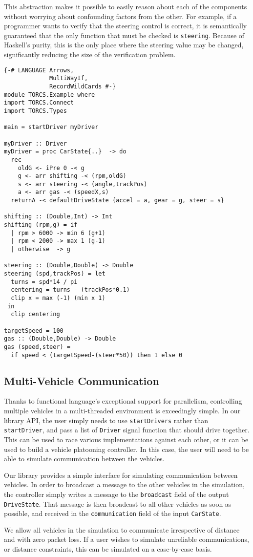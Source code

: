 This abstraction makes it possible to easily reason about each of the components without worrying about confounding factors from the other.
For example, if a programmer wants to verify that the steering control is correct, it is semantically guaranteed that the only function that must be checked is \texttt{steering}.
Because of Haskell's purity, this is the only place where the steering value may be changed, significantly reducing the size of the verification problem.

\begin{lstlisting}[float,floatplacement=TR,caption=A complete basic controller in Yampa, label=lst:driver]
{-# LANGUAGE Arrows,
             MultiWayIf,
             RecordWildCards #-}
module TORCS.Example where
import TORCS.Connect
import TORCS.Types

main = startDriver myDriver

myDriver :: Driver
myDriver = proc CarState{..}  -> do
  rec 
    oldG <- iPre 0 -< g
    g <- arr shifting -< (rpm,oldG)
    s <- arr steering -< (angle,trackPos)
    a <- arr gas -< (speedX,s)
  returnA -< defaultDriveState {accel = a, gear = g, steer = s}

shifting :: (Double,Int) -> Int
shifting (rpm,g) = if 
  | rpm > 6000 -> min 6 (g+1)
  | rpm < 2000 -> max 1 (g-1)
  | otherwise  -> g
 
steering :: (Double,Double) -> Double
steering (spd,trackPos) = let
  turns = spd*14 / pi
  centering = turns - (trackPos*0.1)
  clip x = max (-1) (min x 1)
 in
  clip centering

targetSpeed = 100
gas :: (Double,Double) -> Double
gas (speed,steer) = 
  if speed < (targetSpeed-(steer*50)) then 1 else 0
\end{lstlisting}


\subsection{Multi-Vehicle Communication}

Thanks to functional language's exceptional support for parallelism, controlling multiple vehicles in a multi-threaded environment is exceedingly simple. 
In our library API, the user simply needs to use \texttt{startDrivers} rather than \texttt{startDriver}, and pass a list of \texttt{Driver} signal function that should drive together.
This can be used to race various implementations against each other, or it can be used to build a vehicle platooning controller.
In this case, the user will need to be able to simulate communication between the vehicles.

Our library provides a simple interface for simulating communication between vehicles.
In order to broadcast a message to the other vehicles in the simulation, the controller simply writes a message to the \texttt{broadcast} field of the output \texttt{DriveState}.
That message is then broadcast to all other vehicles as soon as possible, and received in the \texttt{communication} field of the input \texttt{CarState}.

We allow all vehicles in the simulation to communicate irrespective of distance and with zero packet loss.
If a user wishes to simulate unreliable communications, or distance constraints, this can be simulated on a case-by-case basis.
